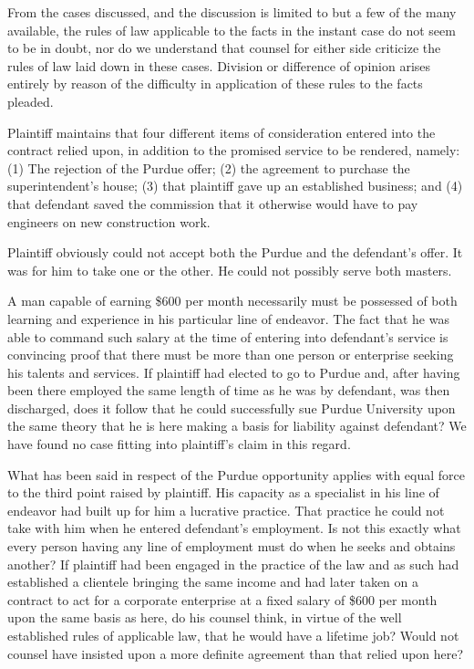 \documentclass[
  letterpaper,
  11pt,
  DIV=9,
  openright]{scrbook}
\begin{document}
From the cases discussed, and the discussion is limited to but a few of
the many available, the rules of law applicable to the facts in the
instant case do not seem to be in doubt, nor do we understand that
counsel for either side criticize the rules of law laid down in these
cases. Division or difference of opinion arises entirely by reason of
the difficulty in application of these rules to the facts pleaded.

Plaintiff maintains that four different items of consideration entered
into the contract relied upon, in addition to the promised service to be
rendered, namely: (1) The rejection of the Purdue offer; (2) the
agreement to purchase the superintendent's house; (3) that plaintiff
gave up an established business; and (4) that defendant saved the
commission that it otherwise would have to pay engineers on new
construction work.

Plaintiff obviously could not accept both the Purdue and the defendant's
offer. It was for him to take one or the other. He could not possibly
serve both masters.

A man capable of earning \$600 per month necessarily must be possessed
of both learning and experience in his particular line of endeavor. The
fact that he was able to command such salary at the time of entering
into defendant's service is convincing proof that there must be more
than one person or enterprise seeking his talents and services. If
plaintiff had elected to go to Purdue and, after having been there
employed the same length of time as he was by defendant, was then
discharged, does it follow that he could successfully sue Purdue
University upon the same theory that he is here making a basis for
liability against defendant? We have found no case fitting into
plaintiff's claim in this regard.

What has been said in respect of the Purdue opportunity applies with
equal force to the third point raised by plaintiff. His capacity as a
specialist in his line of endeavor had built up for him a lucrative
practice. That practice he could not take with him when he entered
defendant's employment. Is not this exactly what every person having any
line of employment must do when he seeks and obtains another? If
plaintiff had been engaged in the practice of the law and as such had
established a clientele bringing the same income and had later taken on
a contract to act for a corporate enterprise at a fixed salary of \$600
per month upon the same basis as here, do his counsel think, in virtue
of the well established rules of applicable law, that he would have a
lifetime job? Would not counsel have insisted upon a more definite
agreement than that relied upon here?
\end{document}
